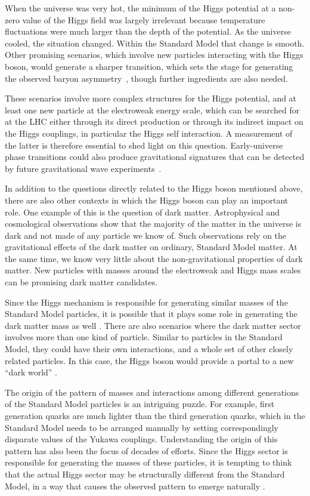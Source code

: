 \documentclass[12pt]{article}
\begin{document}
When the universe was very hot, the minimum of the Higgs potential at
a non-zero value of the Higgs field was largely irrelevant because
temperature fluctuations were much larger than the depth of the
potential.
%
As the universe cooled, the situation changed.
%
Within the Standard Model that change is smooth. Other promising scenarios, which involve new particles interacting with the Higgs boson, would
generate a sharper  transition, which sets the
stage for generating the observed baryon asymmetry~\cite{Cohen:1993nk}, though
further ingredients are also needed.

These scenarios involve more complex structures for the Higgs
potential, and at least one new particle at the electroweak energy scale, which can be
searched for at the LHC either through its direct production or
through its indirect impact on the Higgs couplings, in particular the
Higgs self interaction. 
%
A measurement of the latter is therefore essential to shed light on
this question.
%
Early-universe phase transitions could also produce gravitational signatures that 
can be detected by future gravitational wave
experiments~\cite{Caprini:2015zlo,Caprini:2019egz}. 

In addition to the questions directly related to the Higgs boson
mentioned above, there are also other contexts in which the Higgs boson can play an important role.  One example of this is the question of dark matter. 
Astrophysical and cosmological observations show 
that the majority of the matter in the universe is dark and not made
of any particle we know of.
%
Such observations rely on the
gravitational effects of the dark matter on ordinary, Standard Model
matter.
%
At the same time, we know very little about the non-gravitational
properties of dark matter.
%
New particles with masses around
the electroweak and Higgs mass scales can be promising dark matter
candidates.

Since the Higgs mechanism is responsible for generating similar masses
of the Standard Model particles, it is possible that it plays some role
in generating the dark matter mass as
well
\cite{Silveira:1985rk,Burgess:2000yq,McDonald:1993ex}.
%
There are also scenarios where the dark matter sector involves more
than one kind of particle.
%
Similar to particles in the Standard Model, they could have their own
interactions, and a whole set of other closely related particles.
%
In this case, the Higgs boson would provide a portal to a new ``dark
world'' \cite{Patt:2006fw}. 


The origin of the pattern of masses and interactions among different
generations of the Standard Model particles is an intriguing puzzle.
%
For example, first generation quarks are much
lighter than the third generation quarks, which in the Standard Model
needs to be arranged manually by setting correspondingly disparate
values of the Yukawa couplings.
%
Understanding the origin of this pattern has also
been the focus of decades of efforts.
%
Since the Higgs sector is responsible for generating the masses of
these particles, it is tempting to think that the actual Higgs sector
may be structurally different from the Standard Model, in a way that
causes the observed pattern to emerge naturally \cite{Barr:1976bk,Bjorken:1977vt,Babu:1999me}.
\end{document}
